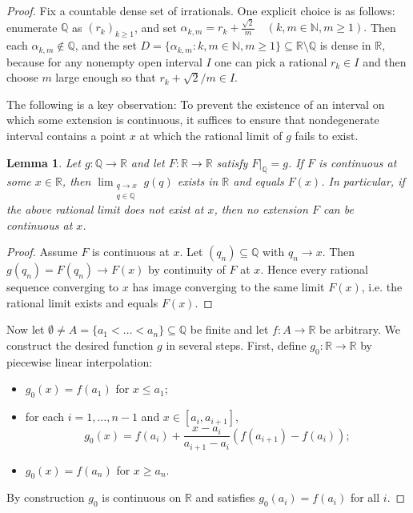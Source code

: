 \documentclass[11pt]{amsart} %
\newtheorem{lemma}[theorem]{Lemma}
\theoremstyle{definition}
\begin{document}
\begin{proof}
Fix a countable dense set of irrationals. One explicit choice is as
follows: enumerate $\mathbb{Q}$ as $(r_k)_{k\ge 1}$, and set $\alpha_{k,m} = r_k + \frac{\sqrt{2}}{m} \quad (k,m\in\mathbb{N}, m\ge 1).$
Then each $\alpha_{k,m}\notin\mathbb{Q}$, and the set $D = \{\alpha_{k,m} : k,m\in\mathbb{N}, m\ge 1\} \subseteq \mathbb{R}\setminus\mathbb{Q}$
is dense in $\mathbb{R}$, because for any nonempty open interval $I$ one can pick a rational
$r_k\in I$ and then choose $m$ large enough so that $r_k+\sqrt{2}/m\in I$.

The following is a key observation: To prevent the existence of an interval on which some extension is continuous, it suffices to ensure that  nondegenerate interval contains a point $x$
at which the rational limit of $g$ fails to exist. 

\begin{lemma} 
Let $g:\mathbb{Q}\rightarrow\mathbb{R}$ and let $F:\mathbb{R}\rightarrow\mathbb{R}$ satisfy $F|_{\mathbb{Q}}=g$. If $F$ is
continuous at some $x\in\mathbb{R}$, then
$ \lim_{\substack{q\rightarrow x\\ q\in\mathbb{Q}}} g(q)$
exists in $\mathbb{R}$ and equals $F(x)$. In particular, if the above rational limit does not exist
at $x$, then no extension $F$ can be continuous at $x$.
\label{lemma:extension}
\end{lemma}

\begin{proof}
Assume $F$ is continuous at $x$. Let $(q_n)\subseteq\mathbb{Q}$ with $q_n\rightarrow x$. Then $g(q_n)=F(q_n)\rightarrow F(x)$ by continuity of $F$ at $x$. Hence every rational sequence converging
to $x$ has image converging to the same limit $F(x)$, i.e. the rational limit exists
and equals $F(x)$.
\end{proof}



Now let $\emptyset \neq A = \{a_1 < \dots < a_n\} \subseteq \mathbb{Q}$ be finite and let $f:A\rightarrow\mathbb{R}$ be arbitrary. We construct the desired function $g$ in several steps.  
First, define $g_0:\mathbb{R}\rightarrow\mathbb{R}$ by
piecewise linear interpolation:
\begin{itemize}
\item $g_0(x) = f(a_1)$ for $x\le a_1$;
\item for each $i=1,\dots,n-1$ and $x\in[a_i, a_{i+1}]$,
\begin{equation} g_0(x) = f(a_i) + \frac{x-a_i}{a_{i+1}-a_i} (f(a_{i+1})-f(a_i)); 
\end{equation} 
\item $g_0(x) = f(a_n)$ for $x\ge a_n$.
\end{itemize}
By construction $g_0$ is continuous on $\mathbb{R}$ and satisfies $g_0(a_i) = f(a_i)$ for all $i$.



\end{proof}
\end{document}
